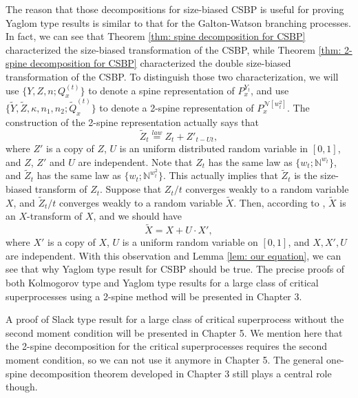 \documentclass[UTF8]{pkuthss}
\theoremstyle{plain}
\theoremstyle{definition}
\numberwithin{equation}{section}
\begin{document}
	The reason that those decompositions for size-biased CSBP is useful for proving Yaglom type results is similar to that for the Galton-Watson branching processes. 
	In fact, we can see that Theorem \ref{thm: spine decomposition for CSBP} characterized the size-biased transformation of the CSBP, while Theorem \ref{thm: 2-spine decomposition for CSBP} characterized the double size-biased transformation of the CSBP. To distinguish those two characterization, we will use $\{Y, Z, n; Q_x^{(t)}\}$ to denote a spine representation of $P_x^{Y_t}$, and use $\{\tilde Y, \tilde Z, \kappa, n_1, n_2; \tilde Q_x^{(t)}\}$ to denote a 2-spine representation of $P_x^{\mathcal N[w_t^2]}$. 
	The construction of the 2-spine representation actually says that
\[
	\tilde Z_t \overset{law}{=} Z_t + Z'_{t-Ut},
\]
	where $Z'$ is a copy of $Z$, $U$ is an uniform distributed random variable in $[0,1]$, and $Z$, $Z'$ and $U$ are independent.
  	Note that $Z_t$ has the same law as $\{w_t;\mathbb N^{w_t}\}$, and $\tilde Z_t$ has the same law as $\{w_t;\mathbb N^{w^2_t}\}$. This actually implies that $\tilde Z_t$ is the size-biased transform of $Z_t$. 
  	Suppose that $Z_t/t$ converges weakly to a random variable $X$, and $\tilde Z_t/t$ converges weakly to a random variable $\tilde X$.
	Then, according to \cite[Lemma 4.3]{LyonsPemantlePeres1995Conceptual}, $\tilde X$ is an $X$-transform of $X$, and we should have
\[
	\tilde X = X+U\cdot X',
\]
	where $X'$ is a copy of $X$, $U$ is a uniform random variable on $[0,1]$, and $X,X',U$ are independent. With this observation and Lemma \ref{lem: our equation}, we can see that why Yaglom type result for CSBP should be true.  The precise proofs of both Kolmogorov type and Yaglom type results for a large class of critical superprocesses using a 2-spine method will be presented in Chapter 3.

	A proof of Slack type result for a large class of critical superprocess without the second moment condition will be presented in Chapter 5. We mention here that the 2-spine decomposition for the critical superprocesses requires the second moment condition, so we can not use it anymore in Chapter 5. 
	The general one-spine decomposition theorem developed in Chapter 3 still plays a central role though. 
\end{document}
